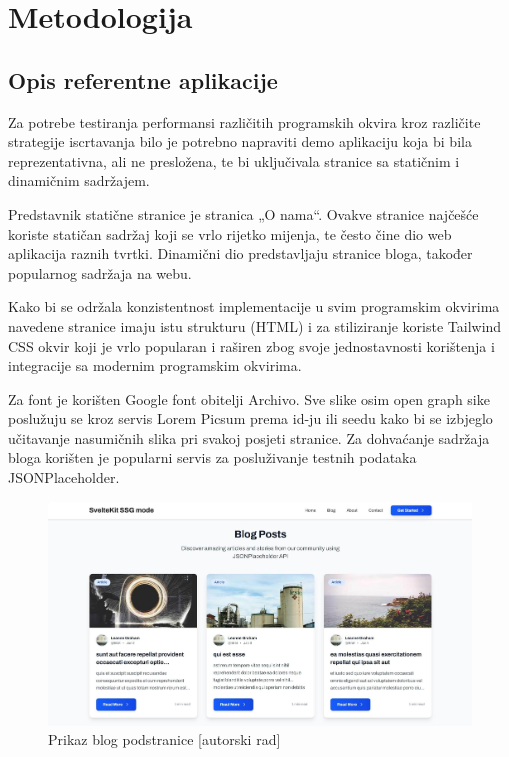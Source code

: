 \section{Metodologija}

\subsection{Opis referentne aplikacije}

Za potrebe testiranja performansi različitih programskih okvira kroz različite strategije iscrtavanja bilo je potrebno napraviti demo aplikaciju koja bi bila reprezentativna, ali ne presložena, te bi uključivala stranice sa statičnim i dinamičnim sadržajem.

\bigskip

Predstavnik statične stranice je stranica „O nama“. Ovakve stranice najčešće koriste statičan sadržaj koji se vrlo rijetko mijenja, te često čine dio web aplikacija raznih tvrtki. Dinamični dio predstavljaju stranice bloga, također popularnog sadržaja na webu.

\bigskip

Kako bi se održala konzistentnost implementacije u svim programskim okvirima navedene stranice imaju istu strukturu (HTML) i za stiliziranje koriste Tailwind CSS okvir koji je vrlo popularan i raširen zbog svoje jednostavnosti korištenja i integracije sa modernim programskim okvirima.

\bigskip

Za font je korišten Google font obitelji Archivo. Sve slike osim open graph sike poslužuju se kroz servis Lorem Picsum prema id-ju ili seedu kako bi se izbjeglo učitavanje nasumičnih slika pri svakoj posjeti stranice. Za dohvaćanje sadržaja bloga korišten je popularni servis za posluživanje testnih podataka JSONPlaceholder.

\bigskip

\begin{figure}[H]
    \centering
    \includegraphics[width=\textwidth]{slike/prikaz-blog-stranice.jpg}
    \caption{Prikaz blog podstranice [autorski rad]}
    \label{fig:prikaz-blog-stranice}
\end{figure}


